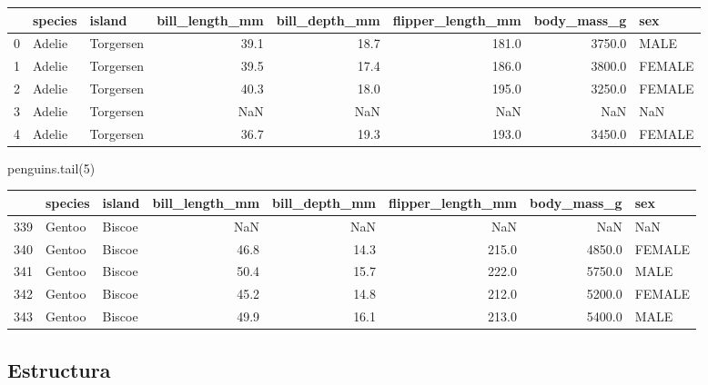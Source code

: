 \documentclass[
  a4paper,
  noprof,
  12pt,
  notoc,
  nosols,
  nobib]{mnye}
\newenvironment{Shaded}{\begin{snugshade}}{\end{snugshade}}
\newcommand{\DecValTok}[1]{\textcolor[rgb]{0.68,0.00,0.00}{#1}}
\newcommand{\NormalTok}[1]{\textcolor[rgb]{0.00,0.23,0.31}{#1}}
\theoremstyle{definition}
\theoremstyle{remark}
\begin{document}
\begin{tabular}{lllrrrrl}
\toprule
{} & species &     island &  bill\_length\_mm &  bill\_depth\_mm &  flipper\_length\_mm &  body\_mass\_g &     sex \\
\midrule
0 &  Adelie &  Torgersen &            39.1 &           18.7 &              181.0 &       3750.0 &    MALE \\
1 &  Adelie &  Torgersen &            39.5 &           17.4 &              186.0 &       3800.0 &  FEMALE \\
2 &  Adelie &  Torgersen &            40.3 &           18.0 &              195.0 &       3250.0 &  FEMALE \\
3 &  Adelie &  Torgersen &             NaN &            NaN &                NaN &          NaN &     NaN \\
4 &  Adelie &  Torgersen &            36.7 &           19.3 &              193.0 &       3450.0 &  FEMALE \\
\bottomrule
\end{tabular}

\begin{Shaded}
\begin{Highlighting}[]
\NormalTok{penguins.tail(}\DecValTok{5}\NormalTok{)}
\end{Highlighting}
\end{Shaded}

\begin{tabular}{lllrrrrl}
\toprule
{} & species &  island &  bill\_length\_mm &  bill\_depth\_mm &  flipper\_length\_mm &  body\_mass\_g &     sex \\
\midrule
339 &  Gentoo &  Biscoe &             NaN &            NaN &                NaN &          NaN &     NaN \\
340 &  Gentoo &  Biscoe &            46.8 &           14.3 &              215.0 &       4850.0 &  FEMALE \\
341 &  Gentoo &  Biscoe &            50.4 &           15.7 &              222.0 &       5750.0 &    MALE \\
342 &  Gentoo &  Biscoe &            45.2 &           14.8 &              212.0 &       5200.0 &  FEMALE \\
343 &  Gentoo &  Biscoe &            49.9 &           16.1 &              213.0 &       5400.0 &    MALE \\
\bottomrule
\end{tabular}

\hypertarget{estructura}{%
\subsection{Estructura}\label{estructura}}
\end{document}

